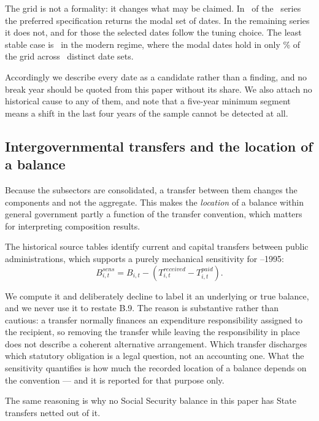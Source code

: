 

The grid is not a formality: it changes what may be claimed. In
\BreakModalAgree\ of the \BreakSeries\ series the preferred specification returns the
modal set of dates. In the remaining series it does not, and for those the selected
dates follow the tuning choice. The least stable case is
\WeakestBreakSector\ in the modern regime, where the modal dates hold in only
\WeakestBreakShare\% of the grid across \WeakestBreakSets\ distinct date sets.

Accordingly we describe every date as a candidate rather than a finding, and no
break year should be quoted from this paper without its share. We also attach no
historical cause to any of them, and note that a five-year minimum segment means a
shift in the last four years of the sample cannot be detected at all.

\subsection{Intergovernmental transfers and the location of a balance}

Because the subsectors are consolidated, a transfer between them changes the
components and not the aggregate. This makes the \emph{location} of a balance within
general government partly a function of the transfer convention, which matters for
interpreting composition results.

The historical source tables identify current and capital transfers between public
administrations, which supports a purely mechanical sensitivity for
\PanelStart--1995:
\[
B^{sens}_{i,t} = B_{i,t} - \left(T^{received}_{i,t} - T^{paid}_{i,t}\right).
\]

We compute it and deliberately decline to label it an underlying or true balance,
and we never use it to restate B.9. The reason is substantive rather than cautious:
a transfer normally finances an expenditure responsibility assigned to the
recipient, so removing the transfer while leaving the responsibility in place does
not describe a coherent alternative arrangement. Which transfer discharges which
statutory obligation is a legal question, not an accounting one. What the
sensitivity quantifies is how much the recorded location of a balance depends on the
convention --- and it is reported for that purpose only.

The same reasoning is why no Social Security balance in this paper has State
transfers netted out of it.


